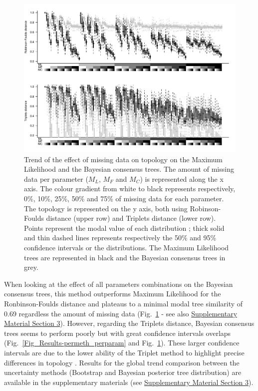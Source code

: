 \documentclass[12pt,letterpaper]{article}
\begin{document}
\begin{figure} 
\centering
    \includegraphics[width=1\textwidth]{Figures/In_main/ML+Baycon-AllParam-RF+Tr-BW.pdf}
\caption{Trend of the effect of missing data on topology on the Maximum Likelihood and the Bayesian consensus trees. The amount of missing data per parameter ($M_{L}$, $M_{F}$ and $M_{C}$) is represented along the x axis. The colour gradient from white to black represents respectively, 0\%, 10\%, 25\%, 50\% and 75\% of missing data for each parameter. The topology is represented on the y axis, both using Robinson-Foulds distance (upper row) and Triplets distance (lower row). Points represent the modal value of each distribution ; thick solid and thin dashed lines represents respectively the 50\% and 95\% confidence intervals or the distributions. The Maximum Likelihood trees are represented in black and the Bayesian consensus trees in grey.}
\label{Fig_Results-global_perparam} %
\end{figure}

When looking at the effect of all parameters combinations on the Bayesian consensus trees, this method outperforms Maximum Likelihood for the Ronbinson-Foulds distance and plateaus to a minimal modal tree similarity of 0.69 regardless the amount of missing data (Fig.~\ref{Fig_Results-global_perparam} - see also \hyperref[SupplementaryMaterial]{Supplementary Material Section 3}). However, regarding the Triplets distance, Bayesian consensus trees seems to perform poorly but with great confidence intervals overlaps (Fig.~\ref{Fig_Results-permeth_perparam} and Fig.~\ref{Fig_Results-global_perparam}). These larger confidence intervals are due to the lower ability of the Triplet method to highlight precise differences in topology \citep{kuhnerpractical2014}. Results for the global trend comparison between the uncertainty methods (Bootstrap and Bayesian posterior tree distribution) are available in the supplementary materials (see \hyperref[SupplementaryMaterial]{Supplementary Material Section 3}).
\end{document}
